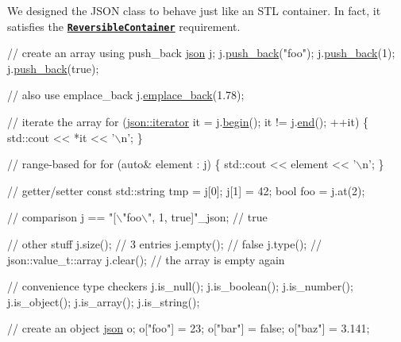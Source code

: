 We designed the J\+S\+ON class to behave just like an S\+TL container. In fact, it satisfies the \href{http://en.cppreference.com/w/cpp/concept/ReversibleContainer}{\tt {\bfseries Reversible\+Container}} requirement.


\begin{DoxyCode}
\textcolor{comment}{// create an array using push\_back}
\hyperlink{classnlohmann_1_1basic__json}{json} j;
j.\hyperlink{classnlohmann_1_1basic__json_ac8e523ddc8c2dd7e5d2daf0d49a9c0d7}{push\_back}(\textcolor{stringliteral}{"foo"});
j.\hyperlink{classnlohmann_1_1basic__json_ac8e523ddc8c2dd7e5d2daf0d49a9c0d7}{push\_back}(1);
j.\hyperlink{classnlohmann_1_1basic__json_ac8e523ddc8c2dd7e5d2daf0d49a9c0d7}{push\_back}(\textcolor{keyword}{true});

\textcolor{comment}{// also use emplace\_back}
j.\hyperlink{classnlohmann_1_1basic__json_aacf5eed15a8b66fb1e88910707a5e229}{emplace\_back}(1.78);

\textcolor{comment}{// iterate the array}
\textcolor{keywordflow}{for} (\hyperlink{classnlohmann_1_1detail_1_1iter__impl}{json::iterator} it = j.\hyperlink{classnlohmann_1_1basic__json_a0ff28dac23f2bdecee9564d07f51dcdc}{begin}(); it != j.\hyperlink{classnlohmann_1_1basic__json_a13e032a02a7fd8a93fdddc2fcbc4763c}{end}(); ++it) \{
  std::cout << *it << \textcolor{charliteral}{'\(\backslash\)n'};
\}

\textcolor{comment}{// range-based for}
\textcolor{keywordflow}{for} (\textcolor{keyword}{auto}& element : j) \{
  std::cout << element << \textcolor{charliteral}{'\(\backslash\)n'};
\}

\textcolor{comment}{// getter/setter}
\textcolor{keyword}{const} std::string tmp = j[0];
j[1] = 42;
\textcolor{keywordtype}{bool} foo = j.at(2);

\textcolor{comment}{// comparison}
j == \textcolor{stringliteral}{"[\(\backslash\)"foo\(\backslash\)", 1, true]"}\_json;  \textcolor{comment}{// true}

\textcolor{comment}{// other stuff}
j.size();     \textcolor{comment}{// 3 entries}
j.empty();    \textcolor{comment}{// false}
j.type();     \textcolor{comment}{// json::value\_t::array}
j.clear();    \textcolor{comment}{// the array is empty again}

\textcolor{comment}{// convenience type checkers}
j.is\_null();
j.is\_boolean();
j.is\_number();
j.is\_object();
j.is\_array();
j.is\_string();

\textcolor{comment}{// create an object}
\hyperlink{classnlohmann_1_1basic__json}{json} o;
o[\textcolor{stringliteral}{"foo"}] = 23;
o[\textcolor{stringliteral}{"bar"}] = \textcolor{keyword}{false};
o[\textcolor{stringliteral}{"baz"}] = 3.141;


\end{DoxyCode}
